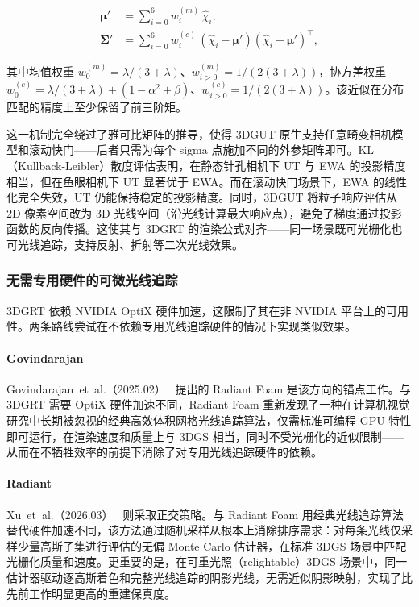 \begin{align*}
\boldsymbol{\mu}' &= \sum_{i=0}^{6} w_i^{(m)}\,\hat{\chi}_i, \\
\boldsymbol{\Sigma}' &= \sum_{i=0}^{6} w_i^{(c)}\,(\hat{\chi}_i - \boldsymbol{\mu}')(\hat{\chi}_i - \boldsymbol{\mu}')^\top,
\end{align*}

其中均值权重 $w_0^{(m)} = \lambda/(3+\lambda)$、$w_{i>0}^{(m)} = 1/(2(3+\lambda))$，协方差权重 $w_0^{(c)} = \lambda/(3+\lambda) + (1-\alpha^2+\beta)$、$w_{i>0}^{(c)} = 1/(2(3+\lambda))$。该近似在分布匹配的精度上至少保留了前三阶矩。

这一机制完全绕过了雅可比矩阵的推导，使得 3DGUT 原生支持任意畸变相机模型和滚动快门——后者只需为每个 sigma 点施加不同的外参矩阵即可。KL（Kullback-Leibler）散度评估表明，在静态针孔相机下 UT 与 EWA 的投影精度相当，但在鱼眼相机下 UT 显著优于 EWA。而在滚动快门场景下，EWA 的线性化完全失效，UT 仍能保持稳定的投影精度。同时，3DGUT 将粒子响应评估从 2D 像素空间改为 3D 光线空间（沿光线计算最大响应点），避免了梯度通过投影函数的反向传播。这使其与 3DGRT 的渲染公式对齐——同一场景既可光栅化也可光线追踪，支持反射、折射等二次光线效果。

\subsubsection{无需专用硬件的可微光线追踪}

3DGRT 依赖 NVIDIA OptiX 硬件加速，这限制了其在非 NVIDIA 平台上的可用性。两条路线尝试在不依赖专用光线追踪硬件的情况下实现类似效果。

\paragraph{Govindarajan}
Govindarajan~et~al.（2025.02）~\cite{2502_01157} 提出的 Radiant Foam 是该方向的锚点工作。与 3DGRT 需要 OptiX 硬件加速不同，Radiant Foam 重新发现了一种在计算机视觉研究中长期被忽视的经典高效体积网格光线追踪算法，仅需标准可编程 GPU 特性即可运行，在渲染速度和质量上与 3DGS 相当，同时不受光栅化的近似限制——从而在不牺牲效率的前提下消除了对专用光线追踪硬件的依赖。

\paragraph{Radiant}
Xu~et~al.（2026.03）~\cite{2603_23637} 则采取正交策略。与 Radiant Foam 用经典光线追踪算法替代硬件加速不同，该方法通过随机采样从根本上消除排序需求：对每条光线仅采样少量高斯子集进行评估的无偏 Monte Carlo 估计器，在标准 3DGS 场景中匹配光栅化质量和速度。更重要的是，在可重光照（relightable）3DGS 场景中，同一估计器驱动逐高斯着色和完整光线追踪的阴影光线，无需近似阴影映射，实现了比先前工作明显更高的重建保真度。

